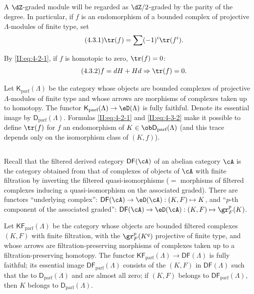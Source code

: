 \subsection{}\label{II:4-3}

A $\dZ$-graded module will be regarded as $\dZ/2$-graded by the parity of
the degree. In particular, if $f$ is an endomorphism of a bounded complex of
projective $\Lambda$-modules of finite type, set
\begin{equation*}\tag{4.3.1}\label{II:eq:4-3-1}
  \tr(f) = \sum (-1)^i \tr(f^i) \text{.}
\end{equation*}

By \eqref{II:eq:4-2-1}, if $f$ is homotopic to zero, $\tr(f) = 0$:
\begin{equation*}\tag{4.3.2}\label{II:eq:4-3-2}
  f = d H + H d \Rightarrow \tr(f) = 0 \text{.}
\end{equation*}

Let $\mathsf{K}_\text{parf}(\Lambda)$ be the category whose objects are
bounded complexes of projective $\Lambda$-modules of finite type and whose
arrows are morphisms of complexes taken up to homotopy. The functor
$\mathsf{K}_\text{parf}(\Lambda)\to\eD(\Lambda)$ is fully faithful. Denote its
essential image by $\mathsf{D}_\text{parf}(\Lambda)$. Formulas
\eqref{II:eq:4-2-1} and \eqref{II:eq:4-3-2} make it possible to define
$\tr(f)$ for $f$ an endomorphism of
$K\in\ob \mathsf{D}_\text{parf}(\Lambda)$ (and this trace depends only on the
isomorphism class of $(K,f)$).






\subsection{}\label{II:4-4}

Recall that the filtered derived category $\mathsf{DF}(\cA)$ of an abelian
category $\cA$ is the category obtained from that of complexes of objects of
$\cA$ with finite filtration by inverting the filtered quasi-isomorphisms
($=$ morphisms of filtered complexes inducing a quasi-isomorphism on the
associated graded). There are functors ``underlying complex'':
$\mathsf{DF}(\cA)\to\eD(\cA): (K,F)\mapsto K$, and ``$p$-th component of the
associated graded'':
$\mathsf{DF}(\cA)\to\eD(\cA): (K,F)\mapsto \gr_F^p(K)$.

Let $\mathsf{KF}_\text{parf}(\Lambda)$ be the category whose objects are
bounded filtered complexes $(K,F)$ with finite filtration, with the
$\gr_F^p(K^q)$ projective of finite type, and whose arrows are
filtration-preserving morphisms of complexes taken up to a
filtration-preserving homotopy. The functor
$\mathsf{KF}_\text{parf}(\Lambda)\to\mathsf{DF}(\Lambda)$ is fully faithful;
its essential image $\mathsf{DF}_\text{parf}(\Lambda)$ consists of the $(K,F)$ in
$\mathsf{DF}(\Lambda)$ such that the  to
$\mathsf{D}_\text{parf}(\Lambda)$ and are almost all zero; if $(K,F)$ belongs to
$\mathsf{DF}_\text{parf}(\Lambda)$, then $K$ belongs to
$\mathsf{D}_\text{parf}(\Lambda)$.

